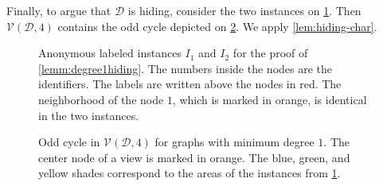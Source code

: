\documentclass[11pt]{article}
\newcommand*{\alvgd}{\mathcal{V}(\mathcal{D},n)}
\newcommand*{\ports}{\mathsf{prt}}
\begin{document}


Finally, to argue that $\mathcal{D}$ is hiding, consider the two instances on
\cref{fig:instancesdeg1}. 
Then $\mathcal{V}(\mathcal{D},4)$ contains the odd cycle depicted on
\cref{fig:oddcycledegree1}. 
We apply \cref{lem:hiding-char}.

\begin{figure}
  \centering
  
  \caption{Anonymous labeled instances $I_1$ and $I_2$ for the proof of
  \cref{lemm:degree1hiding}.
  The numbers inside the nodes are the identifiers.
  The labels are written above the nodes in red.
  The neighborhood of the node $1$, which is marked in orange, is identical in
  the two instances.}
  \label{fig:instancesdeg1}
\end{figure}

\begin{figure}
  \centering
  \resizebox{\textwidth}{!}{%
    
  }
  \caption{Odd cycle in $\mathcal{V}(\mathcal{D},4)$ for graphs with minimum
  degree $1$. 
  The center node of a view is marked in orange.
  The blue, green, and yellow shades correspond to the areas of the instances
  from \cref{fig:instancesdeg1}.}
  \label{fig:oddcycledegree1}
\end{figure}
\end{document}
